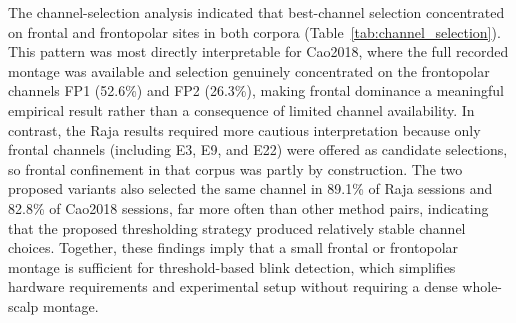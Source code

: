 The channel-selection analysis indicated that best-channel selection concentrated on frontal and frontopolar sites in both corpora (Table~\ref{tab:channel_selection}). This pattern was most directly interpretable for Cao2018, where the full recorded montage was available and selection genuinely concentrated on the frontopolar channels FP1 (52.6\%) and FP2 (26.3\%), making frontal dominance a meaningful empirical result rather than a consequence of limited channel availability. In contrast, the Raja results required more cautious interpretation because only frontal channels (including E3, E9, and E22) were offered as candidate selections, so frontal confinement in that corpus was partly by construction. The two proposed variants also selected the same channel in 89.1\% of Raja sessions and 82.8\% of Cao2018 sessions, far more often than other method pairs, indicating that the proposed thresholding strategy produced relatively stable channel choices. Together, these findings imply that a small frontal or frontopolar montage is sufficient for threshold-based blink detection, which simplifies hardware requirements and experimental setup without requiring a dense whole-scalp montage.
